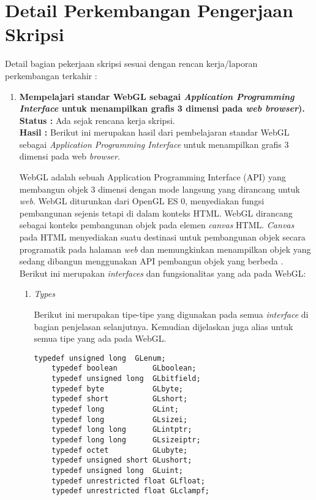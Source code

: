 \documentclass[a4paper,twoside]{article}
\begin{document}
\section{Detail Perkembangan Pengerjaan Skripsi}
Detail bagian pekerjaan skripsi sesuai dengan rencan kerja/laporan perkembangan terkahir :
	\begin{enumerate}
		\item \textbf{Mempelajari standar WebGL sebagai \textit{\textbf{Application Programming Interface}} untuk menampilkan grafis 3
dimensi pada \textit{\textbf{web browser}}).}\\
		{\bf Status :} Ada sejak rencana kerja skripsi.\\
		{\bf Hasil :} Berikut ini merupakan hasil dari pembelajaran standar WebGL sebagai \textit{Application Programming Interface} untuk menampilkan grafis 3 dimensi pada web {\it browser}.
		
WebGL adalah sebuah Application Programming Interface (API) yang membangun objek 3 dimensi dengan mode langsung yang dirancang untuk {\it web}. WebGL diturunkan dari OpenGL ES 0, menyediakan fungsi pembangunan sejenis tetapi di dalam konteks HTML. WebGL dirancang sebagai konteks pembangunan objek pada elemen {\it canvas} HTML. {\it Canvas} pada HTML menyediakan suatu destinasi untuk pembangunan objek secara programatik pada halaman {\it web} dan memungkinkan menampilkan objek yang sedang dibangun menggunakan API pembangun objek yang berbeda \cite{webgl}. Berikut ini merupakan {\it interfaces} dan fungsionalitas yang ada pada WebGL:
\begin{enumerate}
\item {\it Types}

	Berikut ini merupakan tipe-tipe yang digunakan pada semua {\it interface} di bagian penjelasan selanjutnya. Kemudian dijelaskan juga alias untuk semua tipe yang ada pada WebGL.
	\begin{lstlisting}[caption={Alias untuk tipe pada WebGL.}, captionpos=b]
	typedef unsigned long  GLenum;
	typedef boolean        GLboolean;
	typedef unsigned long  GLbitfield;
	typedef byte           GLbyte;
	typedef short          GLshort;
	typedef long           GLint;
	typedef long           GLsizei;
	typedef long long      GLintptr;
	typedef long long      GLsizeiptr;
	typedef octet          GLubyte;
	typedef unsigned short GLushort;
	typedef unsigned long  GLuint;
	typedef unrestricted float GLfloat;
	typedef unrestricted float GLclampf;
	\end{lstlisting}
	

\end{enumerate}
\end{enumerate}
\end{document}
